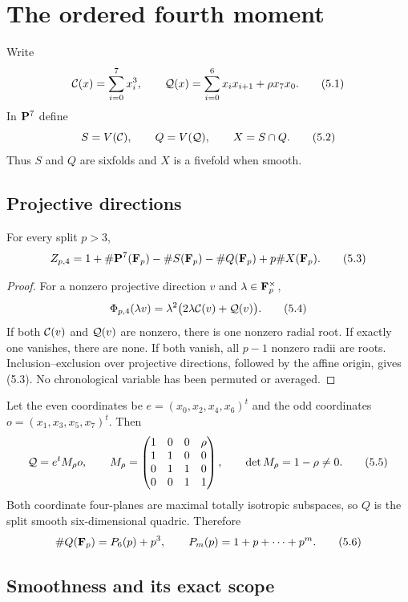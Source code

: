\section{The ordered fourth moment}\label{sec:fourth}

Write
\[
 \mathcal C(x)=\sum_{i=0}^7x_i^3,\qquad
 \mathcal Q(x)=\sum_{i=0}^6x_ix_{i+1}+\rho x_7x_0.             \tag{5.1}
\]
In \(\mathbf P^7\) define
\[
 S=V(\mathcal C),\qquad Q=V(\mathcal Q),\qquad X=S\cap Q.             \tag{5.2}
\]
Thus \(S\) and \(Q\) are sixfolds and \(X\) is a fivefold when smooth.

\subsection{Projective directions}

\begin{proposition}\label{prop:direction}
For every split \(p>3\),
\[
 Z_{p,4}
 =1+\#\mathbf P^7(\mathbf F_p)-\#S(\mathbf F_p)-\#Q(\mathbf F_p)+p\#X(\mathbf F_p).          \tag{5.3}
\]
\end{proposition}

\begin{proof}
For a nonzero projective direction \(v\) and \(\lambda\in\mathbf F_p^\times\),
\[
 \Phi_{p,4}(\lambda v)
 =\lambda^2\bigl(2\lambda\mathcal C(v)+\mathcal Q(v)\bigr).           \tag{5.4}
\]
If both \(\mathcal C(v)\) and \(\mathcal Q(v)\) are nonzero, there is one nonzero radial
root.  If exactly one vanishes, there are none.  If both vanish, all
\(p-1\) nonzero radii are roots.  Inclusion--exclusion over projective
directions, followed by the affine origin, gives (5.3).  No chronological
variable has been permuted or averaged.
\end{proof}

Let the even coordinates be \(e=(x_0,x_2,x_4,x_6)^t\) and the odd
coordinates \(o=(x_1,x_3,x_5,x_7)^t\).  Then
\[
 \mathcal Q=e^tM_\rho o,\qquad
 M_\rho=
 \begin{pmatrix}
 1&0&0&\rho\\
 1&1&0&0\\
 0&1&1&0\\
 0&0&1&1
 \end{pmatrix},
 \qquad\det M_\rho=1-\rho\ne0.                          \tag{5.5}
\]
Both coordinate four-planes are maximal totally isotropic subspaces, so
\(Q\) is the split smooth six-dimensional quadric. Therefore
\[
 \#Q(\mathbf F_p)=P_6(p)+p^3,\qquad
 P_m(p)=1+p+\cdots+p^m.                                \tag{5.6}
\]

\subsection{Smoothness and its exact scope}

